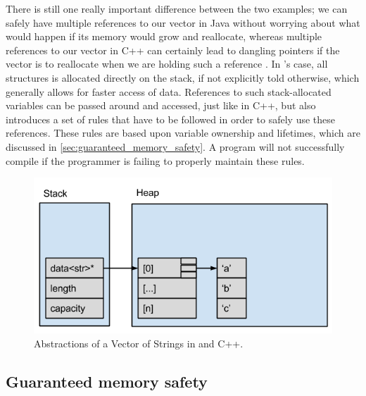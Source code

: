 There is still one really important difference between the two examples; we can safely have multiple references to our vector in Java without worrying about what would happen if its memory would grow and reallocate, whereas multiple references to our vector in C++ can certainly lead to dangling pointers if the vector is to reallocate when we are holding such a reference
.
In \rust's case, all structures is allocated directly on the stack, if not explicitly told otherwise, which generally allows for faster access of data.
References to such stack-allocated variables can be passed around and accessed, just like in C++,
but \rust also introduces a set of rules that have to be followed in order to safely use these references.
These rules are based upon variable ownership and lifetimes, which are discussed in \autoref{sec:guaranteed_memory_safety}.
A \rust program will not successfully compile if the programmer is failing to properly maintain these rules.

\begin{figure}[tb]
  \begin{center}
    \includegraphics[scale=0.5]{figures/cpp_abstractions}
  \end{center}
  \caption{Abstractions of a Vector of Strings in \rust and C++.}
  \label{fig:cpp_abstractions}
\end{figure}

\subsection{Guaranteed memory safety}
\label{sec:guaranteed_memory_safety}

